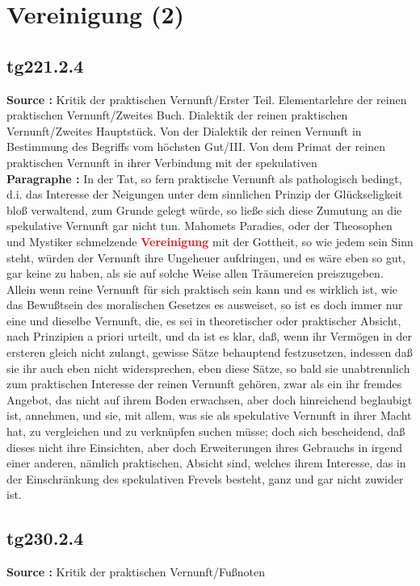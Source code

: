 \documentclass[a4paper,12pt,twoside]{book}
\newcommand{\match}[1]{\textcolor{red}{\textbf{#1}}}
\newcommand{\unnumberedsection}[1]{
	\section*{#1}
	\addcontentsline{toc}{section}{#1}
	\markright{#1}
}
\begin{document}
	\unnumberedsection{Vereinigung (2)} 
	\subsection*{tg221.2.4} 
	\textbf{Source : }Kritik der praktischen Vernunft/Erster Teil. Elementarlehre der reinen praktischen Vernunft/Zweites Buch. Dialektik der reinen praktischen Vernunft/Zweites Hauptstück. Von der Dialektik der reinen Vernunft in Bestimmung des Begriffs vom höchsten Gut/III. Von dem Primat der reinen praktischen Vernunft in ihrer Verbindung mit der spekulativen\\  
	
	\textbf{Paragraphe : }
	In der Tat, so fern praktische Vernunft als pathologisch bedingt, d.i. das Interesse der Neigungen unter dem sinnlichen Prinzip der Glückseligkeit bloß verwaltend, zum Grunde gelegt würde, so ließe sich diese Zumutung an die spekulative Vernunft gar nicht tun. Mahomets Paradies, oder der Theosophen und Mystiker schmelzende \match{Vereinigung} mit der Gottheit, so wie jedem sein Sinn steht, würden der Vernunft ihre Ungeheuer aufdringen, und es wäre eben so gut, gar keine zu haben, als sie auf solche Weise allen Träumereien preiszugeben. Allein wenn reine Vernunft für sich praktisch sein kann und es wirklich ist, wie das Bewußtsein des moralischen Gesetzes es ausweiset, so ist es doch immer nur eine und dieselbe Vernunft, die, es sei in theoretischer oder praktischer Absicht, nach Prinzipien a priori urteilt, und da ist es klar, daß, wenn ihr Vermögen in der ersteren gleich nicht zulangt, gewisse Sätze behauptend festzusetzen, indessen daß sie ihr auch eben nicht widersprechen, eben diese Sätze, so bald sie unabtrennlich zum praktischen Interesse der reinen Vernunft gehören, zwar als ein ihr fremdes Angebot, das nicht auf ihrem Boden erwachsen, aber doch hinreichend beglaubigt ist, annehmen, und sie, mit allem, was sie als spekulative Vernunft in ihrer Macht hat, zu vergleichen und zu verknüpfen suchen müsse; doch sich bescheidend, daß dieses nicht ihre Einsichten, aber doch Erweiterungen ihres Gebrauchs in irgend einer anderen, nämlich praktischen, Absicht sind, welches ihrem Interesse, das in der Einschränkung des spekulativen Frevels besteht, ganz und gar nicht zuwider ist. 
	
	\subsection*{tg230.2.4} 
	\textbf{Source : }Kritik der praktischen Vernunft/Fußnoten\\  
	
\end{document}

